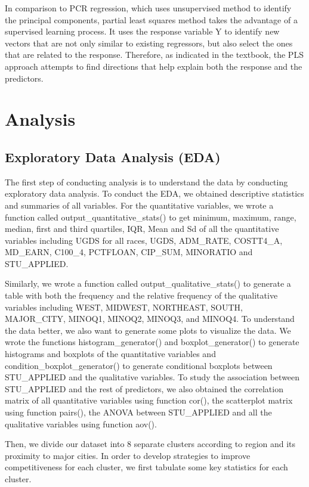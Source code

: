 \documentclass{article}
\begin{document}
In comparison to PCR regression, which uses unsupervised method to identify the principal components, partial least squares method takes the advantage of a supervised learning process. It uses the response variable Y to identify new vectors that are not only similar to existing regressors, but also select the ones that are related to the response. Therefore, as indicated in the textbook, the PLS approach attempts to find directions that help explain both the response and the predictors. 


\section{Analysis}

\subsection{Exploratory Data Analysis (EDA)}

The first step of conducting analysis is to understand the data by conducting exploratory data analysis. To conduct the EDA, we obtained descriptive statistics and summaries of all variables. For the quantitative variables, we wrote a function called output\_quantitative\_stats() to get minimum, maximum, range, median, first and third quartiles, IQR, Mean and Sd of all the quantitative variables including UGDS for all races, UGDS, ADM\_RATE, COSTT4\_A, MD\_EARN, C100\_4, PCTFLOAN, CIP\_SUM, MINORATIO and STU\_APPLIED.

Similarly, we wrote a function called output\_qualitative\_stats() to generate a table with both the frequency and the relative frequency of the qualitative variables including WEST,  MIDWEST, NORTHEAST, SOUTH, MAJOR\_CITY, MINOQ1, MINOQ2, MINOQ3, and MINOQ4. To understand the data better, we also want to generate some plots to visualize the data. We wrote the functions histogram\_generator() and boxplot\_generator() to generate histograms and boxplots of the quantitative variables and condition\_boxplot\_generator() to generate conditional boxplots between STU\_APPLIED and the qualitative variables. To study the association between STU\_APPLIED and the rest of predictors, we also obtained the correlation matrix of all quantitative variables using function cor(), the scatterplot matrix using function pairs(), the ANOVA between STU\_APPLIED and all the qualitative variables using function aov().

Then, we divide our dataset into 8 separate clusters according to region and its proximity to major cities. In order to develop strategies to improve competitiveness for each cluster, we first tabulate some key statistics for each cluster.
\end{document}
